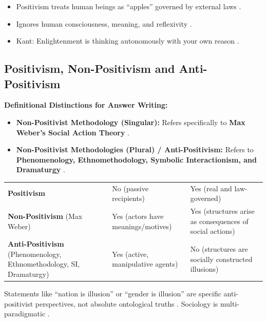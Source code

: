 \begin{QuickRevision}
\begin{itemize}
    \item Positivism treats human beings as ``apples'' governed by external laws .
    \item Ignores human consciousness, meaning, and reflexivity .
    \item Kant: Enlightenment is thinking autonomously with your own reason .
\end{itemize}
\end{QuickRevision}

\subsection{Positivism, Non-Positivism and Anti-Positivism}

\begin{KeyConcept}
\textbf{Definitional Distinctions for Answer Writing:}
\begin{itemize}
    \item \textbf{Non-Positivist Methodology (Singular):} Refers specifically to \textbf{Max Weber's Social Action Theory} .
    \item \textbf{Non-Positivist Methodologies (Plural) / Anti-Positivism:} Refers to \textbf{Phenomenology, Ethnomethodology, Symbolic Interactionism, and Dramaturgy} .
\end{itemize}
\end{KeyConcept}

\vspace{6pt}
\noindent
\begin{tabularx}{\textwidth}{p{4.2cm} p{4.2cm} Y}
\toprule
{}
 &  &  \\
\midrule
\textbf{Positivism} & No (passive recipients) & Yes (real and law-governed)  \\
\textbf{Non-Positivism} (Max Weber) & Yes (actors have meanings/motives) & Yes (structures arise as consequences of social actions)  \\
\textbf{Anti-Positivism} (Phenomenology, Ethnomethodology, SI, Dramaturgy) & Yes (active, manipulative agents) & No (structures are socially constructed illusions)  \\
\bottomrule
\end{tabularx}
\vspace{6pt}

\begin{CriticalPoint}
Statements like ``nation is illusion'' or ``gender is illusion'' are specific anti-positivist perspectives, not absolute ontological truths . Sociology is multi-paradigmatic .
\end{CriticalPoint}

